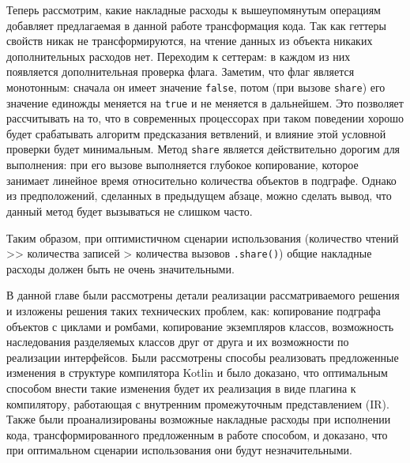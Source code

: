 \documentclass[specification,annotation,times]{itmo-student-thesis}
\begin{document}
Теперь рассмотрим, какие накладные расходы к вышеупомянутым операциям добавляет предлагаемая в данной работе трансформация кода.
Так как геттеры свойств никак не трансформируются, на чтение данных из объекта никаких дополнительных расходов нет.
Переходим к сеттерам: в каждом из них появляется дополнительная проверка флага. Заметим, что флаг является монотонным: сначала он имеет значение \texttt{false}, потом (при вызове \texttt{share}) его значение единожды меняется на \texttt{true} и не меняется в дальнейшем.
Это позволяет рассчитывать на то, что в современных процессорах при таком поведении хорошо будет срабатывать алгоритм предсказания ветвлений, и влияние этой условной проверки будет минимальным.
Метод \texttt{share} является действительно дорогим для выполнения: при его вызове выполняется глубокое копирование, которое занимает линейное время относительно количества объектов в подграфе. Однако из предположений, сделанных в предыдущем абзаце, можно сделать вывод, что данный метод будет вызываться не слишком часто.

Таким образом, при оптимистичном сценарии использования (количество чтений >{}> количества записей > количества вызовов \texttt{.share()})
общие накладные расходы должен быть не очень значительными.


\chapterconclusion

В данной главе были рассмотрены детали реализации рассматриваемого решения и изложены решения таких технических проблем, как: копирование подграфа объектов с циклами и ромбами, копирование экземпляров классов, возможность наследования разделяемых классов друг от друга и их возможности по реализации интерфейсов.
Были рассмотрены способы реализовать предложенные изменения в структуре компилятора Kotlin и было доказано, что оптимальным способом внести такие изменения будет их реализация в виде плагина к компилятору, работающая с внутренним промежуточным представлением (IR).
Также были проанализированы возможные накладные расходы при исполнении кода, трансформированного предложенным в работе способом, и доказано, что при оптимальном сценарии использования они будут незначительными.  


\startconclusionpage
\end{document}
